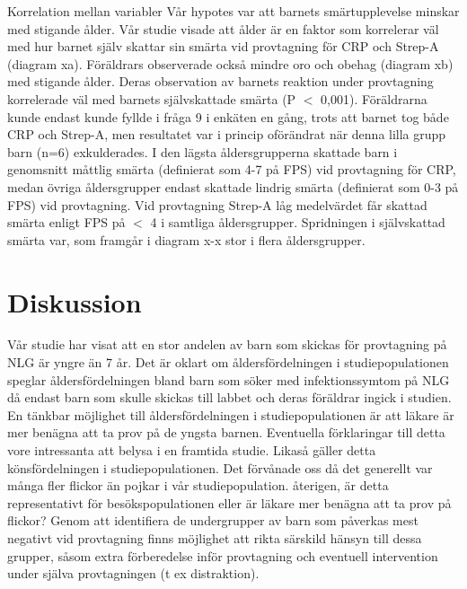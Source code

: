 \documentclass{nature}
\begin{document}
Korrelation mellan variabler V\r{a}r hypotes var att barnets sm\"artupplevelse minskar
med stigande \r{a}lder. V\r{a}r studie visade att \r{a}lder \"ar en faktor som korrelerar v\"al
med hur barnet sj\"alv skattar sin sm\"arta vid provtagning f\"or CRP och Strep-A
(diagram xa). F\"or\"aldrars observerade ocks\r{a} mindre oro och obehag (diagram xb)
med stigande \r{a}lder. Deras observation av barnets reaktion under provtagning
korrelerade v\"al med barnets sj\"alvskattade sm\"arta (P $<$ 0,001).
F\"or\"aldrarna kunde endast kunde fyllde i fr\r{a}ga 9 i enk\"aten en g\r{a}ng, trots att barnet tog b\r{a}de CRP
och Strep-A, men resultatet var i princip of\"or\"andrat n\"ar denna lilla grupp barn
(n=6) exkulderades. I den l\"agsta \r{a}ldersgrupperna skattade barn i genomsnitt
m\r{a}ttlig sm\"arta (definierat som 4-7 p\r{a} FPS) vid provtagning f\"or CRP, medan \"ovriga
\r{a}ldersgrupper endast skattade lindrig sm\"arta (definierat som 0-3 p\r{a} FPS) vid
provtagning. Vid provtagning Strep-A l\r{a}g medelv\"ardet f\r{a}r skattad sm\"arta enligt
FPS p\r{a} $<$ 4 i samtliga \r{a}ldersgrupper. Spridningen i sj\"alvskattad
sm\"arta var, som framg\r{a}r i diagram x-x stor i flera \r{a}ldersgrupper.

\section{Diskussion}

V\r{a}r studie har visat att en stor andelen av barn som skickas f\"or provtagning p\r{a}
NLG \"ar yngre \"an 7 \r{a}r. Det \"ar oklart om \r{a}ldersf\"ordelningen i studiepopulationen
speglar \r{a}ldersf\"ordelningen bland barn som s\"oker med infektionssymtom p\r{a} NLG d\r{a}
endast barn som skulle skickas till labbet och deras f\"or\"aldrar ingick i studien.
En t\"ankbar m\"ojlighet till \r{a}ldersf\"ordelningen i studiepopulationen \"ar att l\"akare
\"ar mer ben\"agna att ta prov p\r{a} de yngsta barnen. Eventuella f\"orklaringar till
detta vore intressanta att belysa i en framtida studie. Likas\r{a} g\"aller detta
k\"onsf\"ordelningen i studiepopulationen. Det f\"orv\r{a}nade oss d\r{a} det generellt var
m\r{a}nga fler flickor \"an pojkar i v\r{a}r studiepopulation. \r{a}terigen, \"ar detta
representativt f\"or bes\"okspopulationen eller \"ar l\"akare mer ben\"agna att ta prov p\r{a}
flickor? Genom att identifiera de undergrupper av barn som p\r{a}verkas mest
negativt vid provtagning finns m\"ojlighet att rikta s\"arskild h\"ansyn till dessa
grupper, s\r{a}som extra f\"orberedelse inf\"or provtagning och eventuell intervention
under sj\"alva provtagningen (t ex distraktion).
\end{document}
